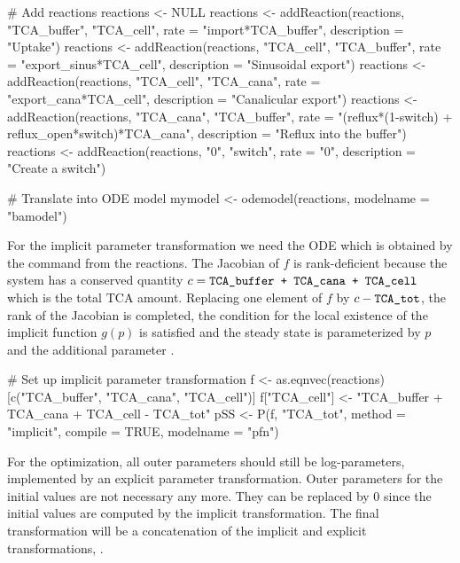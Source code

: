 \documentclass[article]{jss}
\begin{document}
\begin{CodeChunk}
\begin{CodeInput}
# Add reactions
reactions <- NULL
reactions <- addReaction(reactions, "TCA_buffer", "TCA_cell",
		 rate = "import*TCA_buffer",
		 description = "Uptake")
reactions <- addReaction(reactions, "TCA_cell", "TCA_buffer",
		 rate = "export_sinus*TCA_cell",
		 description = "Sinusoidal export")
reactions <- addReaction(reactions, "TCA_cell", "TCA_cana",
		 rate = "export_cana*TCA_cell",
		 description = "Canalicular export")
reactions <- addReaction(reactions, "TCA_cana", "TCA_buffer",
		 rate = "(reflux*(1-switch) + reflux_open*switch)*TCA_cana",
		 description = "Reflux into the buffer")
reactions <- addReaction(reactions, "0", "switch",
		 rate = "0",
		 description = "Create a switch")

# Translate into ODE model
mymodel <- odemodel(reactions, modelname = "bamodel")
\end{CodeInput}
\end{CodeChunk}

For the implicit parameter transformation we need the ODE which is obtained by the command  from the reactions. The Jacobian of $f$ is rank-deficient because the system has a conserved quantity $c = \verb!TCA_buffer + TCA_cana + TCA_cell!$ which is the total TCA amount. Replacing one element of $f$ by $c - \verb!TCA_tot!$, the rank of the Jacobian is completed, the condition for the local existence of the implicit function $g(p)$ is satisfied and the steady state is parameterized by $p$ and the additional parameter .

\begin{CodeChunk}
\begin{CodeInput}
# Set up implicit parameter transformation
f <- as.eqnvec(reactions)[c("TCA_buffer", "TCA_cana", "TCA_cell")]
f["TCA_cell"] <- "TCA_buffer + TCA_cana + TCA_cell - TCA_tot"
pSS <- P(f, "TCA_tot", method = "implicit",
         compile = TRUE, modelname = "pfn")
\end{CodeInput}
\end{CodeChunk}

For the optimization, all outer parameters should still be log-parameters, implemented by an explicit parameter transformation. Outer parameters for the initial values are not necessary any more. They can be replaced by 0 since the initial values are computed by the implicit transformation. The final transformation will be a concatenation of the implicit and explicit transformations, .
\end{document}
